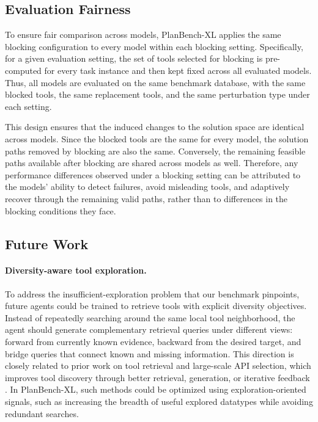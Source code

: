 \documentclass{llmxive}
\providecommand{\bench}[1]{PlanBench-XL}
\begin{document}
\subsection{Evaluation Fairness}
\label{app:evaluation-fairness}

To ensure fair comparison across models, \bench{} applies the same blocking configuration to every model within each blocking setting. 
Specifically, for a given evaluation setting, the set of tools selected for blocking is pre-computed for every task instance and then kept fixed across all evaluated models. 
Thus, all models are evaluated on the same benchmark database, with the same blocked tools, the same replacement tools, and the same perturbation type under each setting.

This design ensures that the induced changes to the solution space are identical across models. 
Since the blocked tools are the same for every model, the solution paths removed by blocking are also the same. 
Conversely, the remaining feasible paths available after blocking are shared across models as well. 
Therefore, any performance differences observed under a blocking setting can be attributed to the models’ ability to detect failures, avoid misleading tools, and adaptively recover through the remaining valid paths, rather than to differences in the blocking conditions they face.

\subsection{Future Work}
\label{app:potential-improvement-methods}

\paragraph{Diversity-aware tool exploration.}
To address the insufficient-exploration problem that our benchmark pinpoints, future agents could be trained to retrieve tools with explicit diversity objectives. 
Instead of repeatedly searching around the same local tool neighborhood, the agent should generate complementary retrieval queries under different views: forward from currently known evidence, backward from the desired target, and bridge queries that connect known and missing information. 
This direction is closely related to prior work on tool retrieval and large-scale API selection, which improves tool discovery through better retrieval, generation, or iterative feedback \citep{APIBench,ToolRet,xu2024enhancing,ToolGen}. 
In \bench{}, such methods could be optimized using exploration-oriented signals, such as increasing the breadth of useful explored datatypes while avoiding redundant searches.
\end{document}
